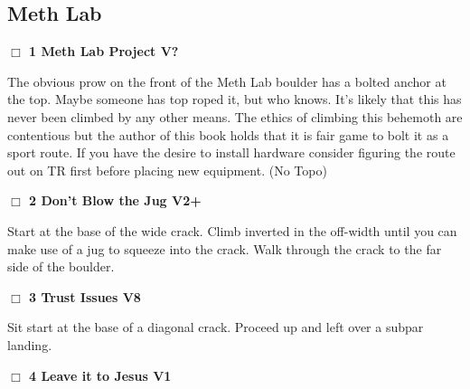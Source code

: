 	\begin{multicols}{2}

\needspace{10em}
\subsection*{Meth Lab}\label{bf:Meth Lab}




\needspace{2em}
\label{rt:Meth Lab Project}
\colorbox{black!20}{
\parbox{0.95\linewidth}{
\hspace{-1ex}\textbf{$\Box$
1 Meth Lab Project V?  \warn\warn\warn
}}}
\begin{adjustwidth}{1.3em}{}			

The obvious prow on the front of the Meth Lab boulder has a bolted anchor at the top. Maybe someone has top roped it, but who knows. It's likely that this has never been climbed by any other means. The ethics of climbing this behemoth are contentious but the author of this book holds that it is fair game to bolt it as a sport route. If you have the desire to install hardware consider figuring the route out on TR first before placing new equipment.
  (No Topo)
\end{adjustwidth}




\needspace{2em}
\label{rt:Don't Blow the Jug}
\colorbox{green!20}{
\parbox{0.95\linewidth}{
\hspace{-1ex}\textbf{$\Box$
2 Don't Blow the Jug V2+  \warn
}}}
\begin{adjustwidth}{1.3em}{}			

Start at the base of the wide crack. Climb inverted in the off-width until you can make use of a jug to squeeze into the crack. Walk through the crack to the far side of the boulder.
\end{adjustwidth}




\needspace{2em}
\label{rt:Trust Issues}
\colorbox{Goldenrod!20}{
\parbox{0.95\linewidth}{
\hspace{-1ex}\textbf{$\Box$
3 Trust Issues V8  \warn\warn
}}}
\begin{adjustwidth}{1.3em}{}			

Sit start at the base of a diagonal crack. Proceed up and left over a subpar landing.
\end{adjustwidth}




\needspace{2em}
\label{rt:Leave it to Jesus}
\colorbox{green!20}{
\parbox{0.95\linewidth}{
\hspace{-1ex}\textbf{$\Box$
4 Leave it to Jesus V1  
}}}
\begin{adjustwidth}{1.3em}{}			


\end{adjustwidth}
\end{multicols}
